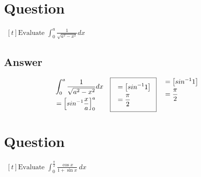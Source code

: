 \documentclass[17pt]{extarticle}
\begin{document}
\noindent
\begin{fleqn} 


\section{Question} 

$\begin{aligned}[t] 
\text{Evaluate \ } \int_{0}^{a} \frac{1}{\sqrt{a^2-x^2}}dx
\end{aligned}$

\subsection*{Answer}
\begin{equation} \nonumber
\begin{alignedat}{4}
& \int_{0}^{a} \frac{1}{\sqrt{a^2-x^2}}dx \\
&= \left[ sin^{-1}\frac{x}{a}\right]_{0}^{a}\\
\end{alignedat}
\quad 
\begin{alignedat}{4}
    \addtolength{\fboxsep}{5pt}
    \boxed{
     \begin{split}
       &= \left[ sin^{-1}1\right]\\
       &= \frac{\pi}{2}\\
        \end{split}
     }\end{alignedat}
\quad
\begin{alignedat}{4}
&= \left[ sin^{-1}1\right]\\
&= \frac{\pi}{2}\\
&  \\
\end{alignedat}
\end{equation}

\section{Question} 

$\begin{aligned}[t] 
\text{Evaluate \ } \int_{0}^{\frac{\pi}{2}} \frac{\cos x}{1+\sin x}\ dx
\end{aligned}$


\end{fleqn}
\end{document}

